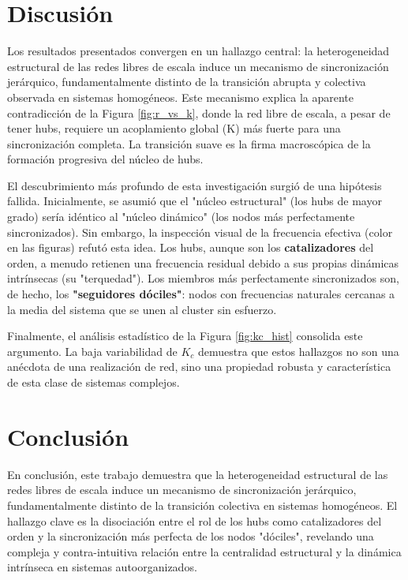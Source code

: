 \documentclass[12pt, a4paper]{article}
\begin{document}
\section{Discusión}

Los resultados presentados convergen en un hallazgo central: la heterogeneidad estructural de las redes libres de escala induce un mecanismo de sincronización jerárquico, fundamentalmente distinto de la transición abrupta y colectiva observada en sistemas homogéneos. Este mecanismo explica la aparente contradicción de la Figura \ref{fig:r_vs_k}, donde la red libre de escala, a pesar de tener hubs, requiere un acoplamiento global (K) más fuerte para una sincronización completa. La transición suave es la firma macroscópica de la formación progresiva del núcleo de hubs.

El descubrimiento más profundo de esta investigación surgió de una hipótesis fallida. Inicialmente, se asumió que el "núcleo estructural" (los hubs de mayor grado) sería idéntico al "núcleo dinámico" (los nodos más perfectamente sincronizados). Sin embargo, la inspección visual de la frecuencia efectiva (color en las figuras) refutó esta idea. Los hubs, aunque son los \textbf{catalizadores} del orden, a menudo retienen una frecuencia residual debido a sus propias dinámicas intrínsecas (su "terquedad"). Los miembros más perfectamente sincronizados son, de hecho, los \textbf{"seguidores dóciles"}: nodos con frecuencias naturales cercanas a la media del sistema que se unen al cluster sin esfuerzo.

Finalmente, el análisis estadístico de la Figura \ref{fig:kc_hist} consolida este argumento. La baja variabilidad de \(K_c\) demuestra que estos hallazgos no son una anécdota de una realización de red, sino una propiedad robusta y característica de esta clase de sistemas complejos.

\section{Conclusión}

En conclusión, este trabajo demuestra que la heterogeneidad estructural de las redes libres de escala induce un mecanismo de sincronización jerárquico, fundamentalmente distinto de la transición colectiva en sistemas homogéneos. El hallazgo clave es la disociación entre el rol de los hubs como catalizadores del orden y la sincronización más perfecta de los nodos "dóciles", revelando una compleja y contra-intuitiva relación entre la centralidad estructural y la dinámica intrínseca en sistemas autoorganizados.
\end{document}
